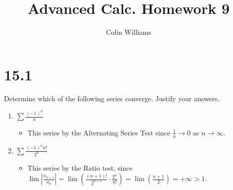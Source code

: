 \documentclass[10pt,a4paper]{article}
\title{Advanced Calc. Homework 9}
\author{Colin Williams}
\theoremstyle{definition}
\begin{document}
\maketitle

\section*{15.1}
Determine which of the following series converge. Justify your answers.
\begin{enumerate}[label = (\alph*)]
\item $\displaystyle \sum \frac{(-1)^n}{n}$
	\begin{itemize}
	\item This series  by the Alternating Series Test since $\frac{1}{n} \to 0$ as $n \to \infty$.
	\end{itemize}
\item $\displaystyle \sum \frac{(-1)^nn!}{2^n}$
	\begin{itemize}
	\item This series  by the Ratio test, since $\lim|\frac{a_{n+1}}{a_n}| = \lim\left(\frac{(n+1)!}{2^{n+1}} \cdot \frac{2^n}{n!}\right) = \lim\left(\frac{n + 1}{2}\right) = +\infty > 1$.
	\end{itemize}
\end{enumerate}
\end{document}
